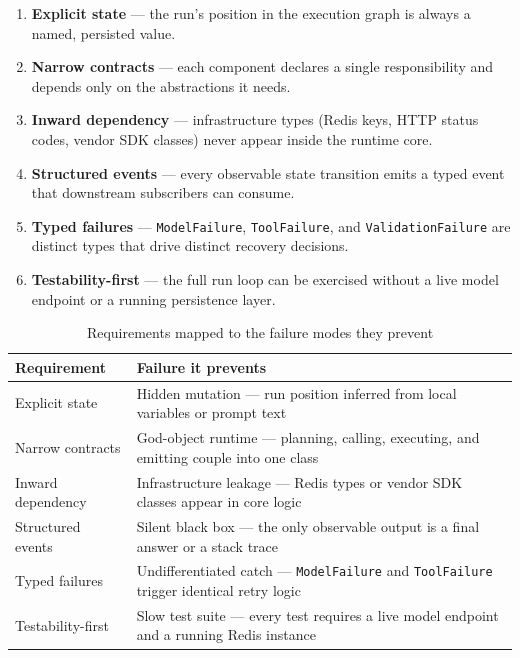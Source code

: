 \begin{enumerate}
  \item \textbf{Explicit state} — the run's position in the execution graph is
        always a named, persisted value.
  \item \textbf{Narrow contracts} — each component declares a single
        responsibility and depends only on the abstractions it needs.
  \item \textbf{Inward dependency} — infrastructure types (Redis keys, HTTP
        status codes, vendor SDK classes) never appear inside the runtime core.
  \item \textbf{Structured events} — every observable state transition emits a
        typed event that downstream subscribers can consume.
  \item \textbf{Typed failures} — \texttt{ModelFailure}, \texttt{ToolFailure},
        and \texttt{ValidationFailure} are distinct types that drive distinct
        recovery decisions.
  \item \textbf{Testability-first} — the full run loop can be exercised without
        a live model endpoint or a running persistence layer.
\end{enumerate}

\begin{table}[htbp]
\centering
\caption{Requirements mapped to the failure modes they prevent}
\label{tab:requirements-failure-modes}
\begin{tabular}{ll}
\toprule
\textbf{Requirement} & \textbf{Failure it prevents} \\
\midrule
Explicit state     & Hidden mutation — run position inferred from local variables or prompt text \\
Narrow contracts   & God-object runtime — planning, calling, executing, and emitting couple into one class \\
Inward dependency  & Infrastructure leakage — Redis types or vendor SDK classes appear in core logic \\
Structured events  & Silent black box — the only observable output is a final answer or a stack trace \\
Typed failures     & Undifferentiated catch — \texttt{ModelFailure} and \texttt{ToolFailure} trigger identical retry logic \\
Testability-first  & Slow test suite — every test requires a live model endpoint and a running Redis instance \\
\bottomrule
\end{tabular}
\end{table}

